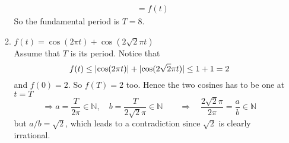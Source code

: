 \documentclass[12pt, a4paper]{article}
\DeclarePairedDelimiter{\abs}{\lvert}{\rvert}
\begin{document}
\begin{enumerate}
\begin{enumerate}
\begin{align*}
                 &= f(t)
        \end{align*}
        So the fundamental period is $T = 8$.
      \item $f(t) = \cos(2 \pi t) + \cos(2 \sqrt{2} \pi t)$ \\[12pt]
        Assume that $T$ is its period. Notice that 
        \[ f(t) \leq \abs{ \cos(2 \pi t) } 
        + \abs{ \cos(2 \sqrt{2} \pi t) } \leq 1 + 1 = 2\]
        and $f(0) = 2$. So $f(T) = 2$ too. Hence the two cosines has to be one at $t = T$
        \[ \Rightarrow a = \frac{T}{2\pi} \in \mathbb{N} ,\quad b = \frac{T}{2\sqrt{2}\pi} \in \mathbb{N} 
        \quad \quad \Rightarrow \quad \frac{2\sqrt{2}\pi}{2\pi} = \frac{a}{b} \in \mathbb{N}\]
        but $ a / b = \sqrt{2} $, which leads to a contradiction since $\sqrt{2}$ is clearly
        irrational.
        

    \end{enumerate}
\end{enumerate}
\end{document}
